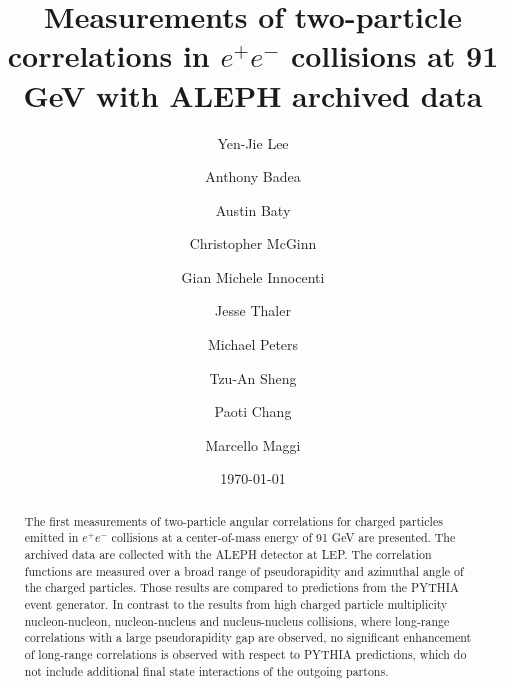\documentclass[aps,prl,twocolumn,showpacs,superscriptaddress,groupedaddress]{revtex4}  %
\begin{document}
\widetext
{}

\title{Measurements of two-particle correlations in $e^+e^-$ collisions at 91 GeV with ALEPH archived data}
\author{Yen-Jie Lee}
\author{Anthony Badea}
\author{Austin Baty}
\author{Christopher McGinn}
\author{Gian Michele Innocenti}
\author{Jesse Thaler}
\author{Michael Peters}
%
\author{Tzu-An Sheng}
\author{Paoti Chang}
%
\author{Marcello Maggi}
%

\date{\today}


\begin{abstract}
The first measurements of two-particle angular correlations for charged particles emitted in $e^+e^-$ collisions at a center-of-mass energy of 91 GeV are presented. The archived data are collected with the ALEPH detector at LEP. The correlation functions are measured over a broad range of pseudorapidity and azimuthal angle of the charged particles. Those results are compared to predictions from the PYTHIA event generator. In contrast to the results from high charged particle multiplicity nucleon-nucleon, nucleon-nucleus and nucleus-nucleus collisions, where long-range correlations with a large pseudorapidity gap are observed, no significant enhancement of long-range correlations is observed with respect to PYTHIA predictions, which do not include additional final state interactions of the outgoing partons. 
\end{abstract}

\pacs{}
\maketitle
\end{document}
